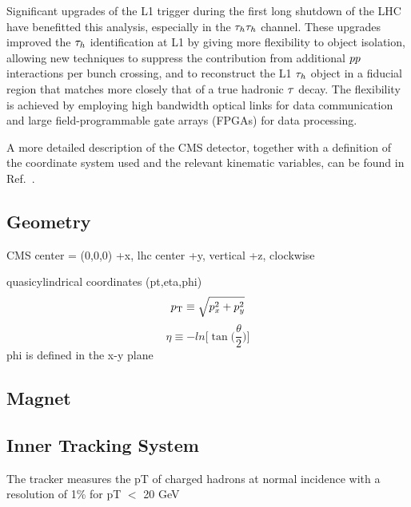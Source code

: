 Significant upgrades of the L1 trigger during the first long shutdown of the LHC have benefitted this analysis, especially in the $\tau_{h}\tau_{h}$ channel. These upgrades improved the $\tau_{h}$ identification at L1 by giving more flexibility to object isolation, allowing new techniques to suppress the contribution from additional $pp$ interactions per bunch
crossing, and to reconstruct the L1 $\tau_{h}$ object in a fiducial region that matches more closely that of a true hadronic $\tau$ decay. The flexibility is achieved by employing high bandwidth optical links for data communication and large field-programmable gate arrays (FPGAs) for data processing.

A more detailed description of the CMS detector, together with a definition of the coordinate system used and the relevant kinematic variables, can be found in Ref.~\cite{Chatrchyan:2008zzk}.

\subsection{Geometry}
CMS center = (0,0,0)
+x, lhc center
+y, vertical
+z, clockwise

quasicylindrical coordinates (pt,eta,phi)
\begin{equation}
p_\mathrm{T} \equiv \sqrt{p^{2}_{x} + p^{2}_{y}}
\end{equation}
\begin{equation}
\eta \equiv -ln\bigg[\tan\bigg(\frac{\theta}{2}\bigg)\bigg]
\end{equation}
phi is defined in the x-y plane

\subsection{Magnet}
\subsection{Inner Tracking System}

The tracker measures the pT of charged hadrons at normal incidence with a resolution of 1\% for pT $<$ 20 GeV

